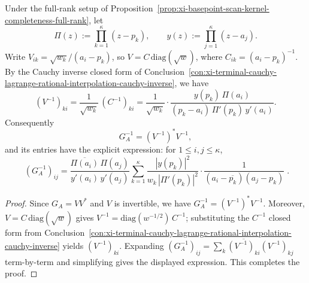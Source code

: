 \begin{proposition}\label{prop:xi-basepoint-scan-gram-inverse-closed-form}
Under the full-rank setup of Proposition~\ref{prop:xi-basepoint-scan-kernel-completeness-full-rank}, let
\[
\Pi(z):=\prod_{k=1}^{\kappa}(z-p_k),\qquad
y(z):=\prod_{j=1}^{\kappa}(z-a_j).
\]
Write \(V_{ik}=\sqrt{w_k}/(a_i-p_k)\), so \(V=C\,\mathrm{diag}(\sqrt w)\), where \(C_{ik}=(a_i-p_k)^{-1}\).
By the Cauchy inverse closed form of Conclusion~\ref{con:xi-terminal-cauchy-lagrange-rational-interpolation-cauchy-inverse}, we have
\[
(V^{-1})_{k i}
=\frac{1}{\sqrt{w_k}}\,(C^{-1})_{k i}
=\frac{1}{\sqrt{w_k}}\cdot
\frac{y(p_k)\,\Pi(a_i)}{(p_k-a_i)\,\Pi'(p_k)\,y'(a_i)}.
\]
Consequently
\[
G_A^{-1}=(V^{-1})^\ast V^{-1},
\]
and its entries have the explicit expression: for \(1\le i,j\le \kappa\),
\[
\boxed{\;
(G_A^{-1})_{ij}
=
\frac{\overline{\Pi(a_i)}\,\Pi(a_j)}{y'(a_i)\,y'(a_j)}
\sum_{k=1}^{\kappa}
\frac{|y(p_k)|^2}{w_k\,|\Pi'(p_k)|^2}\cdot
\frac{1}{(a_i-\overline{p_k})(a_j-p_k)}\; }.
\]
\end{proposition}
\begin{proof}
Since \(G_A=VV^\ast\) and \(V\) is invertible, we have \(G_A^{-1}=(V^{-1})^\ast V^{-1}\).
Moreover, \(V=C\,\mathrm{diag}(\sqrt w)\) gives \(V^{-1}=\mathrm{diag}(w^{-1/2})\,C^{-1}\); substituting the \(C^{-1}\) closed form from Conclusion~\ref{con:xi-terminal-cauchy-lagrange-rational-interpolation-cauchy-inverse} yields \((V^{-1})_{ki}\).
Expanding
\(
(G_A^{-1})_{ij}=\sum_{k}\overline{(V^{-1})_{ki}}(V^{-1})_{kj}
\)
term-by-term and simplifying gives the displayed expression. This completes the proof.
\end{proof}

